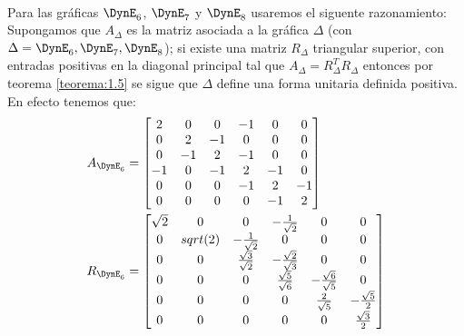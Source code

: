 \paragraph{}
Para las gráficas $\DynE_{6}$, $\DynE_{7}$ y $\DynE_{8}$ usaremos el siguente razonamiento:\\
Supongamos que $A_{\Delta}$ es la matriz asociada a la gráfica $\Delta$ (con $\Delta = \DynE_{6},\DynE_{7},\DynE_{8}$); si existe una matriz $R_{\Delta}$ triangular superior, con entradas positivas en la diagonal principal tal que $A_{\Delta} = R_{\Delta}^{T}R_{\Delta}$ entonces por teorema \ref{teorema:1.5} se sigue que $\Delta$ define una forma unitaria definida positiva.\\
En efecto tenemos que:
\begin{align*}
 A_{\DynE_{6}} &  =  \begin{bmatrix}
 2 & 0 & 0 & -1 & 0 & 0\\
 0 & 2 & -1 & 0 & 0 & 0\\
 0 & -1 & 2& -1 & 0 & 0\\
 -1 & 0 & -1 & 2 & -1 & 0\\
 0 & 0 & 0 & -1 & 2 & -1\\
 0 & 0 & 0 & 0 & -1 & 2\\
 \end{bmatrix}\\
 R_{\DynE_{6}} &  =   \begin{bmatrix}
 \sqrt{2} & 0 & 0 & -\frac{1}{\sqrt{2}} & 0 & 0\\
 0 & sqrt(2) & - \frac{1}{\sqrt{2}}& 0 & 0 & 0\\
 0 & 0 & \frac{\sqrt{3}}{\sqrt{2}} & -\frac{\sqrt{2}}{\sqrt{3}} & 0 & 0\\
 0 & 0 & 0 & \frac{\sqrt{5}}{\sqrt{6}} & -\frac{\sqrt{6}}{\sqrt{5}} & 0\\
 0 & 0 & 0 & 0 & \frac{2}{\sqrt{5}} & -\frac{\sqrt{5}}{2}\\
 0 & 0 & 0 & 0 & 0 & \frac{\sqrt{3}}{2}\\
 \end{bmatrix}
 \end{align*}\\
